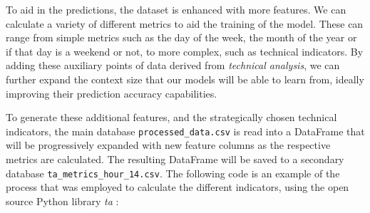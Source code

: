 \documentclass[12pt]{report} %
\begin{document}
To aid in the predictions, the dataset is enhanced with more features. We can calculate a variety of different metrics to aid the training of the model. These can range from simple metrics such as the day of the week, the month of the year or if that day is a weekend or not, to more complex, such as technical indicators. By adding these auxiliary points of data derived from \textit{technical analysis}, we can further expand the context size that our models will be able to learn from, ideally improving their prediction accuracy capabilities.

To generate these additional features, and the strategically chosen technical indicators, the main database \small{\verb|processed_data.csv|} is read into a DataFrame that will be progressively expanded with new feature columns as the respective metrics are calculated. The resulting DataFrame will be saved to a secondary database \small{\verb|ta_metrics_hour_14.csv|}. The following code is an example of the process that was employed to calculate the different indicators, using the open source Python library \textit{ta} \cite{ta-lib}:
\end{document}

